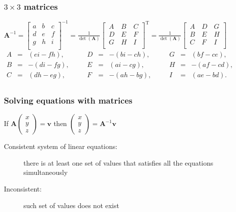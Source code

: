 \subsubsection{$3\times3$ matrices}
$\mathbf {A} ^{-1}={\begin{bmatrix}a&b&c\\d&e&f\\g&h&i\\\end{bmatrix}}^{-1}={\frac {1}{\det(\mathbf {A} )}}{\begin{bmatrix}\,A&\,B&\,C\\\,D&\,E&\,F\\\,G&\,H&\,I\\\end{bmatrix}}^{\mathrm {T} }={\frac {1}{\det(\mathbf {A} )}}{\begin{bmatrix}\,A&\,D&\,G\\\,B&\,E&\,H\\\,C&\,F&\,I\\\end{bmatrix}}$\\
$\begin{alignedat}{6}A&={}&(ei-fh),&\quad &D&={}&-(bi-ch),&\quad &G&={}&(bf-ce),\\B&={}&-(di-fg),&\quad &E&={}&(ai-cg),&\quad &H&={}&-(af-cd),\\C&={}&(dh-eg),&\quad &F&={}&-(ah-bg),&\quad &I&={}&(ae-bd).\\\end{alignedat}$

\subsubsection{Solving equations with matrices}
If $\mathbf{A}\begin{pmatrix}
	x\\y\\z
\end{pmatrix}=\mathbf{v}$ then $\begin{pmatrix}
	x\\y\\z
\end{pmatrix}=\mathbf{A}^{-1}\mathbf{v}$
\begin{description}
	\item[Consistent system of linear equations:] there is at least one set of values that satisfies all the equations simultaneously
	\item[Inconsistent:] such set of values does not exist
\end{description}

